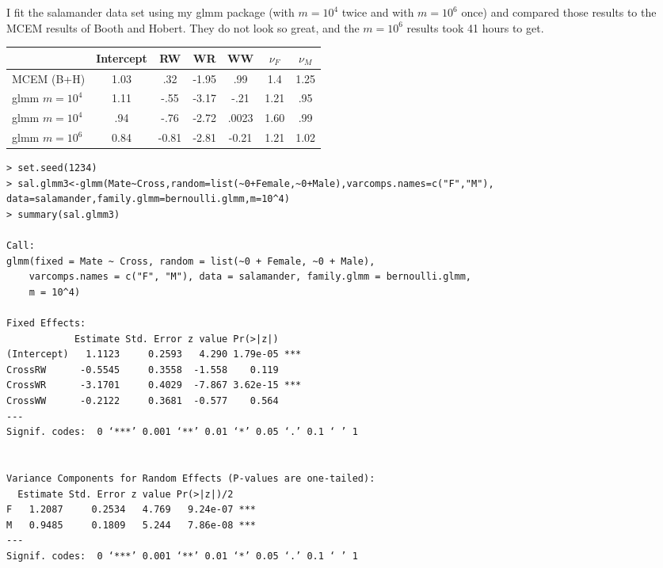 \documentclass{article}
\begin{document}
I fit the salamander data set using  my glmm package (with $m=10^4$ twice and with $m=10^6$ once)  and compared those results to the MCEM results of Booth and Hobert. They do not look so great, and the $m=10^6$ results took 41 hours to get.

\begin{tabular}{lcccccc}
& Intercept & RW & WR & WW & $\nu_F$ & $\nu_M$ \\ \hline
MCEM (B+H) & 1.03 & .32 & -1.95 & .99 & 1.4 & 1.25 \\
glmm $m=10^4$ & 1.11 & -.55 & -3.17& -.21 & 1.21 & .95 \\
glmm $m=10^4$ & .94 & -.76 & -2.72 & .0023 & 1.60 & .99 \\
glmm $m=10^6$ &  0.84&  -0.81&  -2.81&  -0.21&1.21& 1.02 \\
\end{tabular}


\begin{verbatim}
> set.seed(1234)
> sal.glmm3<-glmm(Mate~Cross,random=list(~0+Female,~0+Male),varcomps.names=c("F","M"),
data=salamander,family.glmm=bernoulli.glmm,m=10^4)
> summary(sal.glmm3)

Call:
glmm(fixed = Mate ~ Cross, random = list(~0 + Female, ~0 + Male), 
    varcomps.names = c("F", "M"), data = salamander, family.glmm = bernoulli.glmm, 
    m = 10^4)

Fixed Effects:
            Estimate Std. Error z value Pr(>|z|)    
(Intercept)   1.1123     0.2593   4.290 1.79e-05 ***
CrossRW      -0.5545     0.3558  -1.558    0.119    
CrossWR      -3.1701     0.4029  -7.867 3.62e-15 ***
CrossWW      -0.2122     0.3681  -0.577    0.564    
---
Signif. codes:  0 ‘***’ 0.001 ‘**’ 0.01 ‘*’ 0.05 ‘.’ 0.1 ‘ ’ 1


Variance Components for Random Effects (P-values are one-tailed):
  Estimate Std. Error z value Pr(>|z|)/2    
F   1.2087     0.2534   4.769   9.24e-07 ***
M   0.9485     0.1809   5.244   7.86e-08 ***
---
Signif. codes:  0 ‘***’ 0.001 ‘**’ 0.01 ‘*’ 0.05 ‘.’ 0.1 ‘ ’ 1

\end{verbatim}
\end{document}

